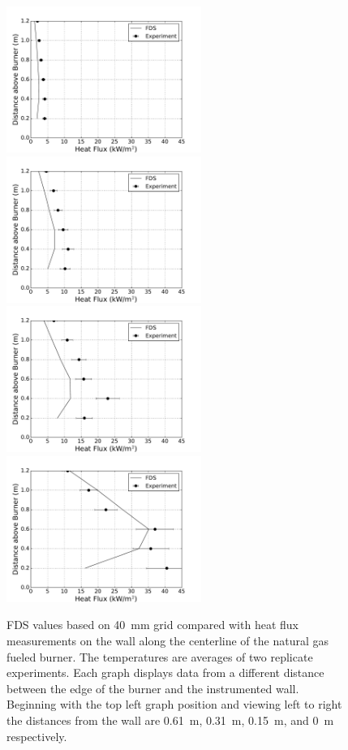 \documentclass[twoside]{uocthesis}
\begin{document}
\begin{figure}[ht!]
  \centering
  \includegraphics[width=2.5in]{../Figures/IWGB_NG_HF_Center_Avg_2D}
  \includegraphics[width=2.5in]{../Figures/IWGB_NG_HF_Center_Avg_1D}\\
  \includegraphics[width=2.5in]{../Figures/IWGB_NG_HF_Center_Avg_0p5D}
  \includegraphics[width=2.5in]{../Figures/IWGB_NG_HF_Center_Avg_0D}\\
  \caption[FDS values based on 40~mm grid compared with heat flux measurements on the wall along the centerline of the natural gas fueled burner]{FDS values based on 40~mm grid compared with heat flux measurements on the wall along the centerline of the natural gas fueled burner. The temperatures are averages of two replicate experiments. Each graph displays data from a different distance between the edge of the burner and the instrumented wall.  Beginning with the top left graph position and viewing left to right the distances from the wall are 0.61~m, 0.31~m, 0.15~m, and 0~m respectively.}
  \label{FDS_HFCL_TWNG_comp}
\end{figure}
\end{document}
